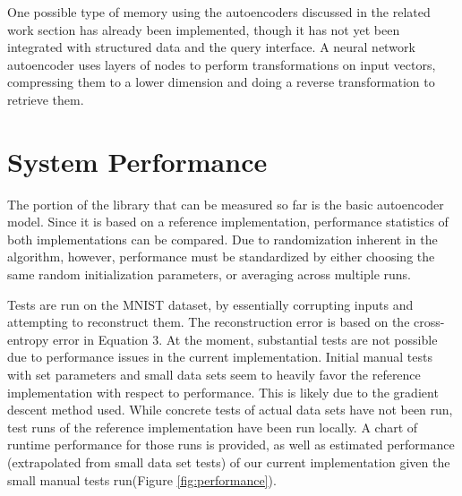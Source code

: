 \documentclass{sig-alternate}
\begin{document}
One possible type of memory using the autoencoders discussed in the related work
section has already been implemented, though it has not yet been integrated with
structured data and the query interface. A neural network autoencoder uses layers of nodes to perform 
transformations on input vectors, compressing them to a lower dimension and doing a reverse 
transformation to retrieve them. 


\section{System Performance}
\label{sec:sysperformance}

The portion of the library that can be measured so far is the basic autoencoder model. 
Since it is based on a reference implementation, performance statistics of both
implementations can be compared. Due to randomization inherent in the algorithm, however, 
performance must be standardized by either choosing the same random initialization parameters, or 
averaging across multiple runs. 

Tests are run on the MNIST dataset, by essentially corrupting inputs and 
attempting to reconstruct them. 
The reconstruction error is based on the cross-entropy error in Equation 3. 
At the moment, substantial tests are not possible due to performance issues in the current 
implementation. Initial manual tests with set parameters and small data sets seem to heavily favor 
the reference implementation with respect to performance. This is likely due to the gradient descent
method used. While concrete tests of actual data sets have not 
been run, test runs of the reference implementation have been run locally. A chart of runtime
performance for those runs is provided, as well as estimated performance (extrapolated from
small data set tests) of our current 
implementation given the small manual tests run(Figure \ref{fig:performance}). 
\end{document}
